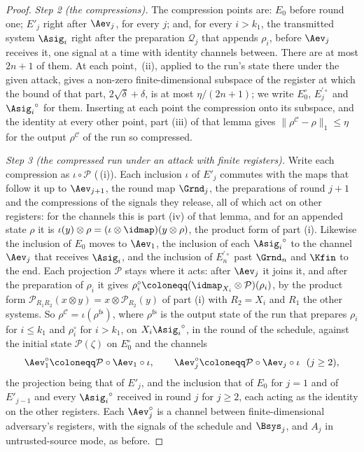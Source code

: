 \begin{proof}
\emph{Step 2 (the compressions).} The compression points are: $E_0$ before
round one; $E'_j$ right after $\Aev_j$, for every $j$; and, for every $i>k_1$,
the transmitted system $\Asig_i$ right after the preparation $\mathcal{Q}_j$
that appends $\rho_i$, before $\Aev_j$ receives it, one signal at a time with
identity channels between. There are at most $2n+1$ of them. At each point,
\,(ii), applied to the run's state
there under the given attack, gives a non-zero finite-dimensional subspace of
the register at which the bound of that part, $2\sqrt{\delta}+\delta$, is at
most $\eta/(2n+1)$; we write $E_0^{\circ}$, $E_j^{\prime\circ}$ and
${\Asig_i}^{\circ}$ for them. Inserting at each point the compression onto its
subspace, and the identity at every other point, part (iii) of that lemma
gives $\|\rho^{\mathcal{C}}-\rho\|_1\le\eta$ for the output
$\rho^{\mathcal{C}}$ of the run so compressed.

\emph{Step 3 (the compressed run under an attack with finite registers).}
Write each compression as $\iota\circ\mathcal{P}$
(\,(i)). Each inclusion $\iota$ of
$E'_{j}$ commutes with the maps that follow it up to $\Aev_{j+1}$, the round
map $\Grnd_j$, the preparations of round $j+1$ and the compressions of the
signals they release, all of which act on other registers: for the channels
this is part (iv) of that lemma, and for an appended state $\rho$ it is
$\iota(y)\otimes\rho=(\iota\otimes\idmap)(y\otimes\rho)$, the product form of
part (i). Likewise the inclusion of $E_0$ moves to $\Aev_1$, the inclusion of
each ${\Asig_i}^{\circ}$ to the channel $\Aev_j$ that receives $\Asig_i$, and
the inclusion of $E_n^{\prime\circ}$ past $\Grnd_n$ and $\Kfin$ to the end.
Each projection $\mathcal{P}$ stays where it acts: after $\Aev_j$ it joins
it, and after the preparation of $\rho_i$ it gives
$\rho_i^{\circ}\coloneqq(\idmap_{X_i}\otimes\mathcal{P})(\rho_i)$, by the
product form $\mathcal{P}_{R_1R_2}(x\otimes y)=x\otimes\mathcal{P}_{R_2}(y)$
of part (i) with $R_2=X_i$ and $R_1$ the other systems. So
$\rho^{\mathcal{C}}=\iota(\rho^{\mathrm{fs}})$, where $\rho^{\mathrm{fs}}$ is
the output state of the run that prepares $\rho_i$ for $i\le k_1$ and
$\rho_i^{\circ}$ for $i>k_1$, on $X_i{\Asig_i}^{\circ}$, in the round of the
schedule, against the initial state $\mathcal{P}(\zeta)$ on $E_0^{\circ}$ and
the channels
\begin{equation*}
  \Aev^{\circ}_1\coloneqq\mathcal{P}\circ\Aev_1\circ\iota,
  \qquad
  \Aev^{\circ}_j\coloneqq\mathcal{P}\circ\Aev_j\circ\iota\ \ (j\ge2),
\end{equation*}
the projection being that of $E'_j$, and the inclusion that of $E_0$ for
$j=1$ and of $E'_{j-1}$ and every ${\Asig_i}^{\circ}$ received in round $j$ for
$j\ge2$, each acting as the identity on the other registers. Each
$\Aev^{\circ}_j$ is a channel between finite-dimensional adversary's
registers, with the signals of the schedule and $\Bsys_j$, and $A_j$ in
untrusted-source mode, as before.


\end{proof}
